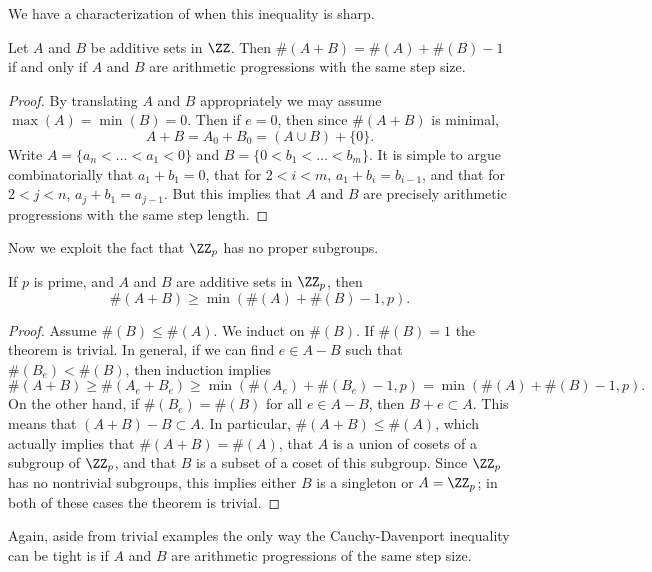 We have a characterization of when this inequality is sharp.

\begin{lemma}
    Let $A$ and $B$ be additive sets in $\ZZ$. Then $\#(A + B) = \#(A) + \#(B) - 1$ if and only if $A$ and $B$ are arithmetic progressions with the same step size.
\end{lemma}
\begin{proof}
    By translating $A$ and $B$ appropriately we may assume $\max(A) = \min(B) = 0$. Then if $e = 0$, then since $\#(A + B)$ is minimal,
    \[ A + B = A_0 + B_0 = (A \cup B) + \{ 0 \}. \]
    Write $A = \{ a_n < \dots < a_1 < 0 \}$ and $B = \{ 0 < b_1 < \dots < b_m \}$. It is simple to argue combinatorially that $a_1 + b_1 = 0$, that for $2 < i < m$, $a_1 + b_i = b_{i-1}$, and that for $2 < j < n$, $a_j + b_1 = a_{j-1}$. But this implies that $A$ and $B$ are precisely arithmetic progressions with the same step length.
\end{proof}

Now we exploit the fact that $\ZZ_p$ has no proper subgroups.

\begin{lemma}
    If $p$ is prime, and $A$ and $B$ are additive sets in $\ZZ_p$, then
    \[ \#(A + B) \geq \min(\#(A) + \#(B) - 1, p). \]
\end{lemma}
\begin{proof}
    Assume $\#(B) \leq \#(A)$. We induct on $\#(B)$. If $\#(B) = 1$ the theorem is trivial. In general, if we can find $e \in A - B$ such that $\#(B_e) < \#(B)$, then induction implies
    \[ \#(A + B) \geq \#(A_e + B_e) \geq \min(\#(A_e) + \#(B_e) - 1, p) = \min(\#(A) + \#(B) - 1, p). \]
    On the other hand, if $\#(B_e) = \#(B)$ for all $e \in A - B$, then $B + e \subset A$. This means that $(A + B) - B \subset A$. In particular, $\#(A + B) \leq \#(A)$, which actually implies that $\#(A + B) = \#(A)$, that $A$ is a union of cosets of a subgroup of $\ZZ_p$, and that $B$ is a subset of a coset of this subgroup. Since $\ZZ_p$ has no nontrivial subgroups, this implies either $B$ is a singleton or $A = \ZZ_p$; in both of these cases the theorem is trivial.
\end{proof}

Again, aside from trivial examples the only way the Cauchy-Davenport inequality can be tight is if $A$ and $B$ are arithmetic progressions of the same step size.

